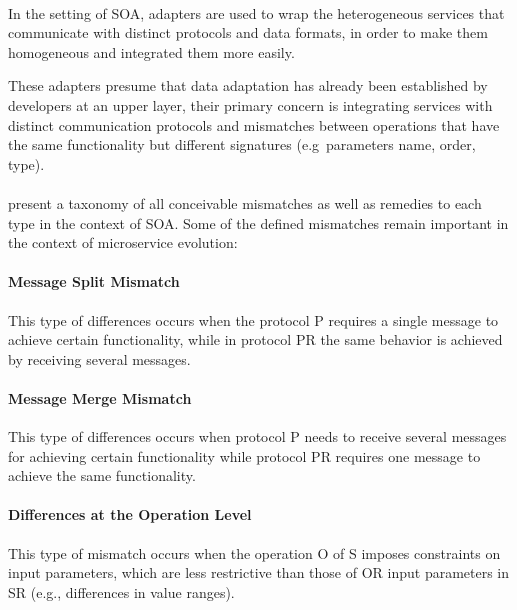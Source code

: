 \paragraph{}

In the setting of SOA, adapters are used to wrap the heterogeneous services that communicate with distinct protocols and data formats,
in order to make them homogeneous and integrated them more easily.

These adapters presume that data adaptation has already been established by developers at an upper layer,
their primary concern is integrating services with distinct communication protocols and mismatches between operations that have the
same functionality but different signatures (e.g\ parameters name, order, type).

\paragraph{}

\citeauthor{adaptersWebServices} \cite{adaptersWebServices} present a taxonomy of all conceivable mismatches as well as remedies to each type in the context of SOA.
Some of the defined mismatches remain important in the context of microservice evolution:

\paragraph{Message Split Mismatch}
This type of differences occurs when the protocol P requires a single message to achieve certain functionality,
while in protocol PR the same behavior is achieved by receiving several messages.

\paragraph{Message Merge Mismatch}
This type of differences occurs when protocol P needs to receive several messages for achieving certain
functionality while protocol PR requires one message to achieve the same functionality.

\paragraph{Differences at the Operation Level}
This type of mismatch occurs when the operation O of S imposes constraints on input parameters,
which are less restrictive than those of OR input parameters in SR (e.g., differences in value ranges).

